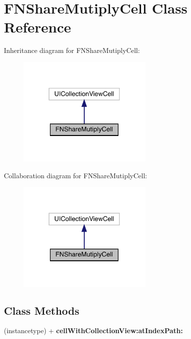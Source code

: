 \hypertarget{interface_f_n_share_mutiply_cell}{}\section{F\+N\+Share\+Mutiply\+Cell Class Reference}
\label{interface_f_n_share_mutiply_cell}


Inheritance diagram for F\+N\+Share\+Mutiply\+Cell\+:\nopagebreak
\begin{figure}[H]
\begin{center}
\leavevmode
\includegraphics[width=189pt]{interface_f_n_share_mutiply_cell__inherit__graph}
\end{center}
\end{figure}


Collaboration diagram for F\+N\+Share\+Mutiply\+Cell\+:\nopagebreak
\begin{figure}[H]
\begin{center}
\leavevmode
\includegraphics[width=189pt]{interface_f_n_share_mutiply_cell__coll__graph}
\end{center}
\end{figure}
\subsection*{Class Methods}
\begin{DoxyCompactItemize}
\item 
\mbox{\label{interface_f_n_share_mutiply_cell_ad86cd349b511d6a5268480f42eaf06b3}} 
(instancetype) + {\bfseries cell\+With\+Collection\+View\+:at\+Index\+Path\+:}
\end{DoxyCompactItemize}
